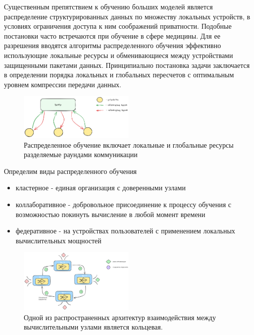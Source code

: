 Существенным препятствием к обучению больших моделей является распределение структурированных данных по множеству
локальных устройств, в условиях ограничения доступа к ним соображений приватности. Подобные постановки часто встречаются
при обучение в сфере медицины. Для ее разрешения вводятся  алгоритмы распределенного обучения эффективно использующие
локальные ресурсы и обменивающиеся между устройствами защищенными пакетами данных. Принципиально постановка задачи
заключается в определении порядка локальных и глобальных пересчетов с оптимальным уровнем компрессии передачи данных.

\begin{figure}[h]
    \centering
    \includegraphics[width=0.5\textwidth]{assets/math/distributed/distributed.excalidraw.png}
    \caption{Распределенное обучение включает локальные и глобальные ресурсы разделяемые раундами коммуникации }
    \label{distributed}
\end{figure}

Определим виды распределенного обучения \begin{itemize}
    \item кластерное - единая организация с доверенными узлами
    \item коллаборативное - добровольное присоединение к процессу обучения с возможностью покинуть 
          вычисление в любой момент времени 
    \item федеративное - на устройствах пользователей с применением локальных вычислительных мощностей 
\end{itemize}

\begin{figure}[h]
    \centering
    \includegraphics[width=0.5\textwidth]{assets/math/distributed/ring.excalidraw.png}
    \caption{Одной из распространенных архитектур взаимодействия между вычислительными узлами является кольцевая.}
    \label{ring}
\end{figure}

